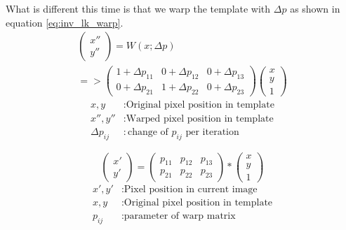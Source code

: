\documentclass[11pt,a4paper,titlepage,oneside]{report}
\begin{document}
What is different this time is that we warp the template with $\Delta p$ as shown in equation \ref{eq:inv_lk_warp}. 
\begin{equation}\label{eq:inv_lk_warp}
  \begin{gathered}
    \begin{pmatrix}
      x'' \\
      y''
    \end{pmatrix}=
    W(x;\Delta p)\\
    =>\begin{pmatrix}
      1 + \Delta p_{11} & 0 + \Delta p_{12} & 0 + \Delta p_{13} \\
      0 + \Delta p_{21} & 1 + \Delta p_{22} & 0 + \Delta p_{23}
    \end{pmatrix}
    \begin{pmatrix}
      x\\
      y\\
      1
    \end{pmatrix}
  \end{gathered}
\end{equation}
\begin{align*}
  x,y            &:  \text{Original pixel position in template}\\
  x'',y''        &:  \text{Warped pixel position in template}\\
  \Delta p_{ij}  &:  \text{change of $p_{ij}$ per iteration}
\end{align*}

\begin{equation}
  \begin{pmatrix}
    x' \\
    y'
  \end{pmatrix}=
  \begin{pmatrix}
    p_{11} & p_{12} & p_{13} \\
    p_{21} & p_{22} & p_{23}
  \end{pmatrix}*
  \begin{pmatrix}
    x\\
    y\\
    1
  \end{pmatrix}
\end{equation}
\begin{align*}
  x',y'          &:  \text{Pixel position in current image}\\
  x,y            &:  \text{Original pixel position in template}\\
  p_{ij}        &:  \text{parameter of warp matrix}\\
\end{align*}
\end{document}
